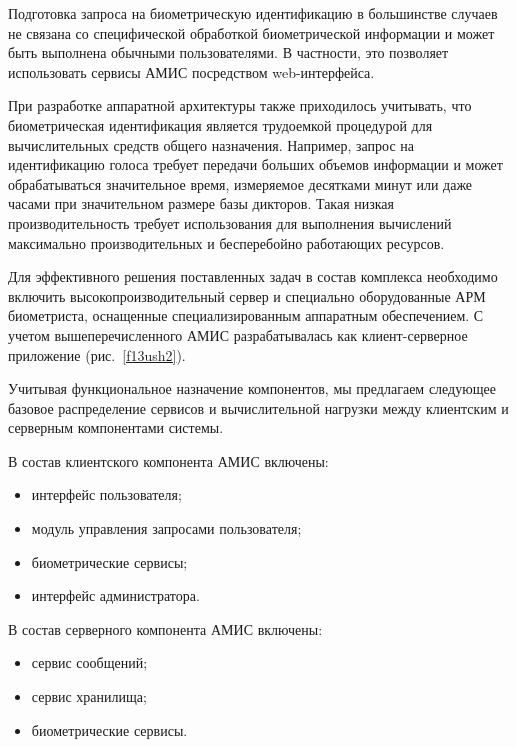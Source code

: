 \begin{multicols}{2}
  Подготовка запроса на биометрическую иден\-ти\-фи\-ка\-цию в большинстве 
случаев не связана со %
специ\-фи\-че\-ской обработкой биометрической информации 
и может быть выполнена обычными пользователями. В частности, это 
позволяет использовать сервисы АМИС посредством web-ин\-тер\-фей\-са.
  
  При разработке аппаратной архитектуры также приходилось учитывать, что 
биометрическая идентификация является трудоемкой процедурой для 
вычислительных средств общего назначения. Например, запрос на 
идентификацию голоса требует передачи больших объемов информации и 
может обрабатываться значительное время, измеряемое десятками минут или 
даже часами при значительном размере базы дикторов. Такая низкая 
производительность требует использования для выполнения вычислений 
максимально производительных и бесперебойно работающих ресурсов. 
  
  Для эффективного решения поставленных задач в состав комплекса 
необходимо включить высокопроизводительный сервер и специально 
оборудованные АРМ биометриста, оснащенные специализированным 
аппаратным обеспечением. С учетом вышеперечисленного АМИС 
разрабатывалась как клиент-серверное приложение (рис.~\ref{f13ush2}). 
  
  Учитывая функциональное назначение компонентов, мы предлагаем 
следующее базовое распределение сервисов и вычислительной нагрузки \mbox{между} 
клиентским и серверным компонентами %
сис\-темы. 

В состав клиентского 
компонента АМИС включены:
  \begin{itemize}
\item интерфейс пользователя;\\[-13pt]
\item модуль управления запросами пользователя;\\[-13pt]
\item биометрические сервисы;\\[-13pt]
\item интерфейс администратора.\\[-13pt]
\end{itemize}

 
  В состав серверного компонента АМИС включены:
  \begin{itemize}
\item сервис сообщений;\\[-13pt]
\item сервис хранилища;\\[-13pt]
\item биометрические сервисы.\\[-13pt]
  \end{itemize}
  


\end{multicols}
